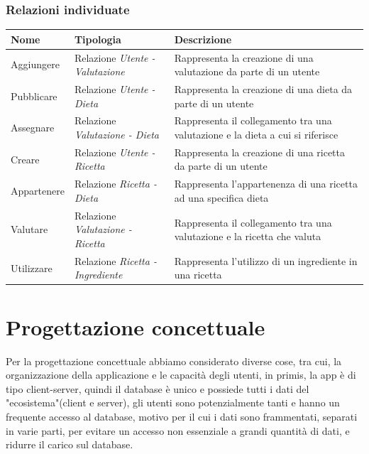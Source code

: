 ﻿\documentclass[a4paper,12pt]{report}
\begin{document}
\subsection{Relazioni individuate}
\begin{table}[h!]
    \centering
    \begin{tabular}{ |p{1.2in}|p{1.2in}|p{2.4in}| }
        \hline
        \scriptsize{\textbf{Nome}} & \scriptsize{\textbf{Tipologia}} & \scriptsize{\textbf{Descrizione}} \\
        \hline
        \scriptsize{Aggiungere} & \scriptsize{Relazione \newline \textit{Utente - Valutazione}} & \scriptsize{Rappresenta la creazione di una valutazione da parte di un utente} \\
        \hline
        \scriptsize{Pubblicare} & \scriptsize{Relazione \newline \textit{Utente - Dieta}} & \scriptsize{Rappresenta la creazione di una dieta da parte di un utente} \\
        \hline
        \scriptsize{Assegnare} & \scriptsize{Relazione \newline \textit{Valutazione - Dieta}} & \scriptsize{Rappresenta il collegamento tra una valutazione e la dieta a cui si riferisce} \\
        \hline
        \scriptsize{Creare} & \scriptsize{Relazione \newline \textit{Utente - Ricetta}} & \scriptsize{Rappresenta la creazione di una ricetta da parte di un utente} \\
        \hline
        \scriptsize{Appartenere} & \scriptsize{Relazione \newline \textit{Ricetta - Dieta}} & \scriptsize{Rappresenta l'appartenenza di una ricetta ad una specifica dieta} \\
        \hline
        \scriptsize{Valutare} & \scriptsize{Relazione \newline \textit{Valutazione - Ricetta}} & \scriptsize{Rappresenta il collegamento tra una valutazione e la ricetta che valuta} \\
        \hline
        \scriptsize{Utilizzare} & \scriptsize{Relazione \newline \textit{Ricetta - Ingrediente}} & \scriptsize{Rappresenta l'utilizzo di un ingrediente in una ricetta} \\
        \hline
    \end{tabular}
\end{table}

\chapter{Progettazione concettuale}
Per la progettazione concettuale abbiamo considerato diverse cose,
tra cui, la organizzazione della applicazione e le capacità degli utenti,
in primis, la app è di tipo client-server, quindi il database è unico e
possiede tutti i dati del "ecosistema"(client e server), gli utenti sono potenzialmente tanti
e hanno un frequente accesso al database, motivo per il cui i dati sono
frammentati, separati in varie parti, per evitare un accesso non essenziale a grandi quantità di dati, e ridurre il carico sul database.    
\end{document}
